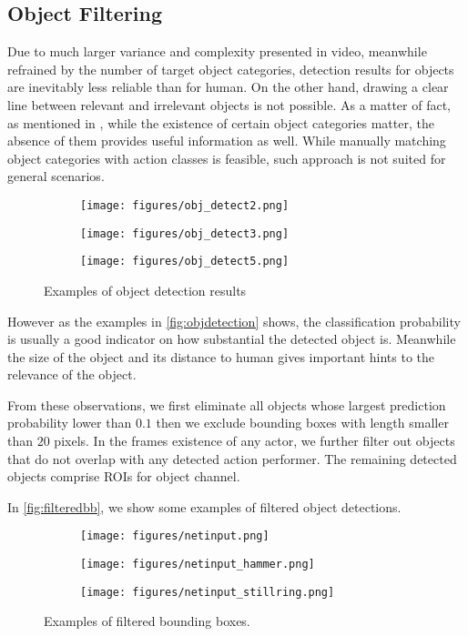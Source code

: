\subsection{Object Filtering}\label{sec:objectfilter}
Due to much larger variance and complexity presented in video, meanwhile refrained by the number of target object categories, detection results for objects are inevitably less reliable than for human. 
On the other hand, drawing a clear line between relevant and irrelevant objects is not possible. 
As a matter of fact, as mentioned in \cite{jain201515}, while the existence of certain object categories matter, the absence of them provides useful information as well.
While manually matching object categories with action classes is feasible, such approach is not suited for general scenarios.

\begin{figure}
\centering
\begin{subfigure}{0.3\linewidth}
\texttt{[image: figures/obj\_detect2.png]}
\end{subfigure}
\begin{subfigure}{0.3\linewidth}
\texttt{[image: figures/obj\_detect3.png]}
\end{subfigure}
\begin{subfigure}{0.3\linewidth}
\texttt{[image: figures/obj\_detect5.png]}
\end{subfigure}
\caption[Object detection examples]{Examples of object detection results}\label{fig:objdetection}
\end{figure}
However as the examples in \autoref{fig:objdetection} shows, the classification probability is usually a good indicator on how substantial the detected object is.
Meanwhile the size of the object and its distance to human gives important hints to the relevance of the object.

From these observations, we first eliminate all objects whose largest prediction probability lower than $ 0.1 $ then we exclude bounding boxes with length smaller than $ 20 $ pixels.
In the frames existence of any actor, we further filter out objects that do not overlap with any detected action performer.
The remaining detected objects comprise ROIs for object channel.

In \autoref{fig:filteredbb}, we show some examples of filtered object detections.
\begin{figure}
\centering
\begin{subfigure}{0.3\linewidth}
\texttt{[image: figures/netinput.png]}
\end{subfigure}
\begin{subfigure}{0.3\linewidth}
\texttt{[image: figures/netinput\_hammer.png]}
\end{subfigure}
\begin{subfigure}{0.3\linewidth}
\texttt{[image: figures/netinput\_stillring.png]}
\end{subfigure}
\caption[Examples of Bounding Box Inputs]{Examples of filtered bounding boxes.}\label{fig:filteredbb}
\end{figure}